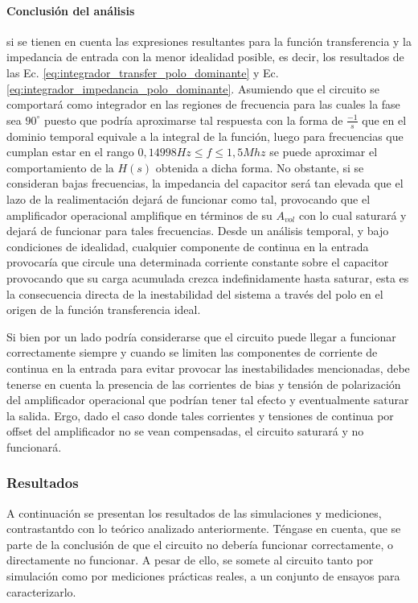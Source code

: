 \paragraph*{Conclusi\'on del an\'alisis} si se tienen en cuenta las expresiones resultantes para 
la funci\'on transferencia y la impedancia de entrada con la menor idealidad posible, es decir, los
resultados de las Ec. \ref{eq:integrador_transfer_polo_dominante} y
Ec. \ref{eq:integrador_impedancia_polo_dominante}. Asumiendo que el circuito se comportar\'a como
integrador en las regiones de frecuencia para las cuales la fase sea $90^{\circ}$ puesto que podría
aproximarse tal respuesta con la forma de $\frac{-1}{s}$ que en el dominio temporal equivale a la
integral de la funci\'on, luego para frecuencias que cumplan estar en el rango 
$0,14998Hz \leq f \leq 1,5Mhz$ se puede aproximar el comportamiento de la $H(s)$ obtenida a
dicha forma. No obstante, si se consideran bajas frecuencias, la impedancia del capacitor ser\'a 
tan elevada que el lazo de la realimentaci\'on dejar\'a de funcionar como tal, provocando que el
amplificador operacional amplifique en t\'erminos de su $A_{vol}$ con lo cual saturar\'a y dejar\'a de
 funcionar para tales frecuencias. Desde un an\'alisis temporal, y bajo condiciones de idealidad, cualquier componente
 de continua en la entrada provocar\'ia que circule una determinada corriente constante sobre el capacitor provocando
 que su carga acumulada crezca indefinidamente hasta saturar, esta es la consecuencia directa de la inestabilidad del sistema a trav\'es del
 polo en el origen de la funci\'on transferencia ideal.

 Si bien por un lado podr\'ia considerarse que el circuito puede llegar a funcionar correctamente siempre y cuando se limiten
 las componentes de corriente de continua en la entrada para evitar provocar las inestabilidades mencionadas, debe tenerse en cuenta
 la presencia de las corrientes de bias y tensi\'on de polarizaci\'on del amplificador operacional que podr\'ian tener tal efecto y eventualmente
 saturar la salida. Ergo, dado el caso donde tales corrientes y tensiones de continua por offset del amplificador no se vean compensadas,
 el circuito saturar\'a y no funcionar\'a.

\subsubsection{Resultados}
A continuaci\'on se presentan los resultados de las simulaciones y mediciones, contrastantdo con lo te\'orico analizado anteriormente. T\'engase en cuenta,
que se parte de la conclusi\'on de que el circuito no deber\'ia funcionar correctamente, o directamente no funcionar. A pesar de ello, se somete al circuito tanto por simulaci\'on
como por mediciones pr\'acticas reales, a un conjunto de ensayos para caracterizarlo.

